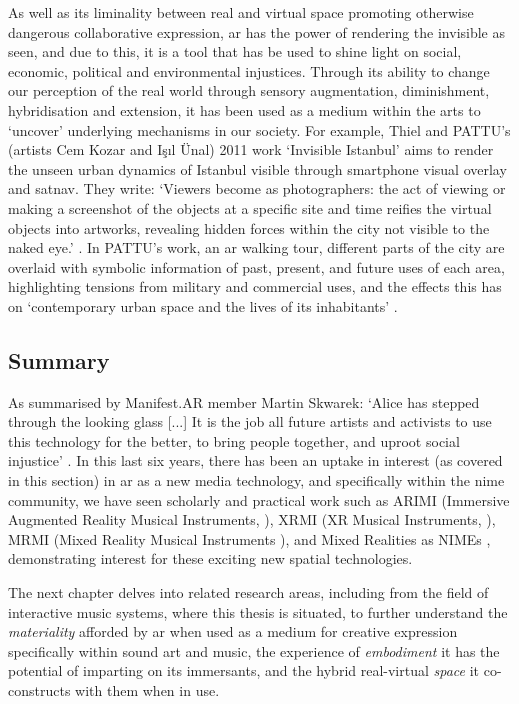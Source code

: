 As well as its liminality between real and virtual space promoting otherwise dangerous collaborative expression, \gls{ar} has the power of rendering the invisible as seen, and due to this, it is a tool that has be used to shine light on social, economic, political and environmental injustices. Through its ability to change our perception of the real world through sensory augmentation, diminishment, hybridisation and extension, it has been used as a medium within the arts to `uncover' underlying mechanisms in our society. For example, Thiel and PATTU's (artists Cem Kozar and Işıl Ünal) 2011 work `Invisible Istanbul' aims to render the unseen urban dynamics of Istanbul visible through smartphone visual overlay and \gls{satnav}. They write: `Viewers become as photographers: the act of viewing or making a screenshot of the objects at a specific site and time reifies the virtual objects into artworks, revealing hidden forces within the city not visible to the naked eye.' \citeyearpar{thiel2011}. In PATTU's work, an \gls{ar} walking tour, different parts of the city are overlaid with symbolic information of past, present, and future uses of each area, highlighting tensions from military and commercial uses, and the effects this has on `contemporary urban space and the lives of its inhabitants' \citeyearpar{thiel2018}.

\subsection{Summary}
As summarised by Manifest.AR member Martin Skwarek: `Alice has stepped through the looking glass [...] It is the job all future artists and activists to use this technology for the better, to bring people together, and uproot social injustice' \citeyearpar{skwarek2018}. In this last six years, there has been an uptake in interest (as covered in this section) in \gls{ar} as a new media technology, and specifically within the \gls{nime} community, we have seen scholarly and practical work such as ARIMI (Immersive Augmented Reality Musical Instruments, \citep{chevalier2017}), XRMI (XR Musical Instruments, \citep{camci2021}), MRMI (Mixed Reality Musical Instruments \citep{zellerbach2022}), and Mixed Realities as NIMEs \citep{bilbow2023}, demonstrating interest for these exciting new spatial technologies.

The next chapter delves into related research areas, including from the field of interactive music systems, where this thesis is situated, to further understand the \textit{materiality} afforded by \gls{ar} when used as a medium for creative expression specifically within sound art and music, the experience of \textit{embodiment} it has the potential of imparting on its immersants, and the hybrid real-virtual \textit{space} it co-constructs with them when in use.